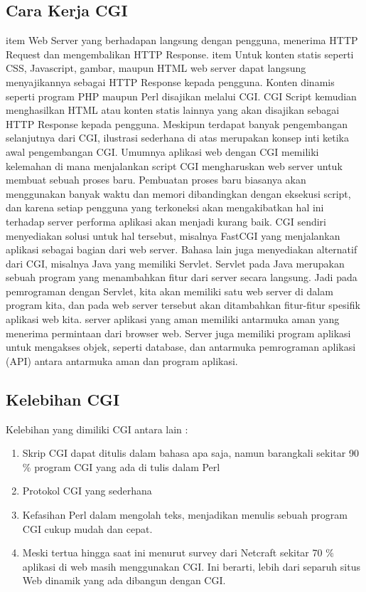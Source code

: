 \begin{enumerate}
\subsection{Cara Kerja CGI}
item Web Server yang berhadapan langsung dengan pengguna, menerima HTTP Request dan mengembalikan HTTP Response. 
item Untuk konten statis seperti CSS, Javascript, gambar, maupun HTML web server dapat langsung menyajikannya sebagai HTTP Response kepada pengguna. Konten dinamis seperti program PHP maupun Perl disajikan melalui CGI. CGI Script kemudian menghasilkan HTML atau konten statis lainnya yang akan disajikan sebagai HTTP Response kepada pengguna.
Meskipun terdapat banyak pengembangan selanjutnya dari CGI, ilustrasi sederhana di atas merupakan konsep inti ketika awal pengembangan CGI. Umumnya aplikasi web dengan CGI memiliki kelemahan di mana menjalankan script CGI mengharuskan web server untuk membuat sebuah proses baru. Pembuatan proses baru biasanya akan menggunakan banyak waktu dan memori dibandingkan dengan eksekusi script, dan karena setiap pengguna yang terkoneksi akan mengakibatkan hal ini terhadap server performa aplikasi akan menjadi kurang baik. 
CGI sendiri menyediakan solusi untuk hal tersebut, misalnya FastCGI yang menjalankan aplikasi sebagai bagian dari web server. Bahasa lain juga menyediakan alternatif dari CGI, misalnya Java yang memiliki Servlet. Servlet pada Java merupakan sebuah program yang menambahkan fitur dari server secara langsung. Jadi pada pemrograman dengan Servlet, kita akan memiliki satu web server di dalam program kita, dan pada web server tersebut akan ditambahkan fitur-fitur spesifik aplikasi web kita.
server aplikasi yang aman memiliki antarmuka aman yang menerima permintaan dari browser web. Server juga memiliki program aplikasi untuk mengakses objek, seperti database, dan antarmuka pemrograman aplikasi (API) antara antarmuka aman dan program aplikasi. 

\subsection{Kelebihan CGI} 
Kelebihan yang dimiliki CGI antara lain :
\begin{enumerate}
	\item Skrip CGI dapat ditulis dalam bahasa apa saja, namun barangkali sekitar 90 $  \%  $ program CGI yang ada di tulis dalam Perl 
	\item Protokol CGI yang sederhana
	\item Kefasihan Perl dalam mengolah teks, menjadikan menulis sebuah program CGI cukup mudah dan cepat.
	\item Meski tertua hingga saat ini menurut survey dari Netcraft sekitar 70 $  \%  $ aplikasi di web masih menggunakan CGI. Ini berarti, lebih dari separuh situs Web dinamik yang ada dibangun dengan CGI.
\end{enumerate}


\end{enumerate}

